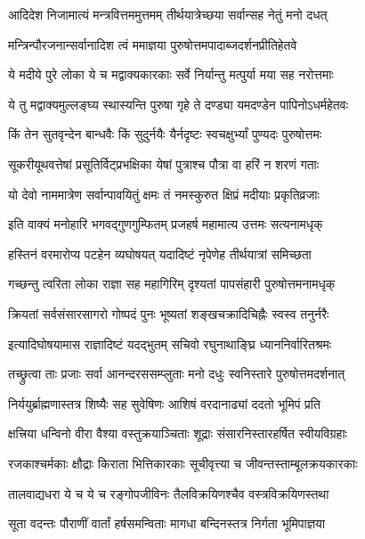 \twolineshloka
{आदिदेश निजामात्यं मन्त्रवित्तममुत्तमम्}
{तीर्थयात्रेच्छया सर्वान्सह नेतुं मनो दधत्}%

\twolineshloka
{मन्त्रिन्पौरजनान्सर्वानादिश त्वं ममाज्ञया}
{पुरुषोत्तमपादाब्जदर्शनप्रीतिहेतवे}%

\twolineshloka
{ये मदीये पुरे लोका ये च मद्वाक्यकारकाः}
{सर्वे निर्यान्तु मत्पुर्या मया सह नरोत्तमाः}%

\twolineshloka
{ये तु मद्वाक्यमुल्लङ्घ्य स्थास्यन्ति पुरुषा गृहे}
{ते दण्ड्या यमदण्डेन पापिनोऽधर्महेतवः}%

\twolineshloka
{किं तेन सुतवृन्देन बान्धवैः किं सुदुर्नयैः}
{यैर्नदृष्टः स्वचक्षुर्भ्यां पुण्यदः पुरुषोत्तमः}%

\twolineshloka
{सूकरीयूथवत्तेषां प्रसूतिर्विट्प्रभक्षिका}
{येषां पुत्राश्च पौत्रा वा हरिं न शरणं गताः}%

\twolineshloka
{यो देवो नाममात्रेण सर्वान्पावयितुं क्षमः}
{तं नमस्कुरुत क्षिप्रं मदीयाः प्रकृतिव्रजाः}%

\twolineshloka
{इति वाक्यं मनोहारि भगवद्गुणगुम्फितम्}
{प्रजहर्ष महामात्य उत्तमः सत्यनामधृक्}%

\twolineshloka
{हस्तिनं वरमारोप्य पटहेन व्यघोषयत्}
{यदादिष्टं नृपेणेह तीर्थयात्रां समिच्छता}%

\twolineshloka
{गच्छन्तु त्वरिता लोका राज्ञा सह महागिरिम्}
{दृश्यतां पापसंहारी पुरुषोत्तमनामधृक्}%

\twolineshloka
{क्रियतां सर्वसंसारसागरो गोष्पदं पुनः}
{भूष्यतां शङ्खचक्रादिचिह्नैः स्वस्व तनुर्नरैः}%

\twolineshloka
{इत्यादिघोषयामास राज्ञादिष्टं यदद्भुतम्}
{सचिवो रघुनाथाङ्घ्रि ध्याननिर्वारितश्रमः}%

\twolineshloka
{तच्छ्रुत्वा ताः प्रजाः सर्वा आनन्दरससम्प्लुताः}
{मनो दधुः स्वनिस्तारे पुरुषोत्तमदर्शनात्}%

\twolineshloka
{निर्ययुर्ब्राह्मणास्तत्र शिष्यैः सह सुवेषिणः}
{आशिषं वरदानाढ्यां ददतो भूमिपं प्रति}%

\twolineshloka
{क्षत्त्रिया धन्विनो वीरा वैश्या वस्तुक्रयाञ्चिताः}
{शूद्राः संसारनिस्तारहर्षित स्वीयविग्रहाः}%

\twolineshloka
{रजकाश्चर्मकाः क्षौद्राः किराता भित्तिकारकाः}
{सूचीवृत्त्या च जीवन्तस्ताम्बूलक्रयकारकाः}%

\twolineshloka
{तालवाद्यधरा ये च ये च रङ्गोपजीविनः}
{तैलविक्रयिणश्चैव वस्त्रविक्रयिणस्तथा}%

\twolineshloka
{सूता वदन्तः पौराणीं वार्तां हर्षसमन्विताः}
{मागधा बन्दिनस्तत्र निर्गता भूमिपाज्ञया}%

